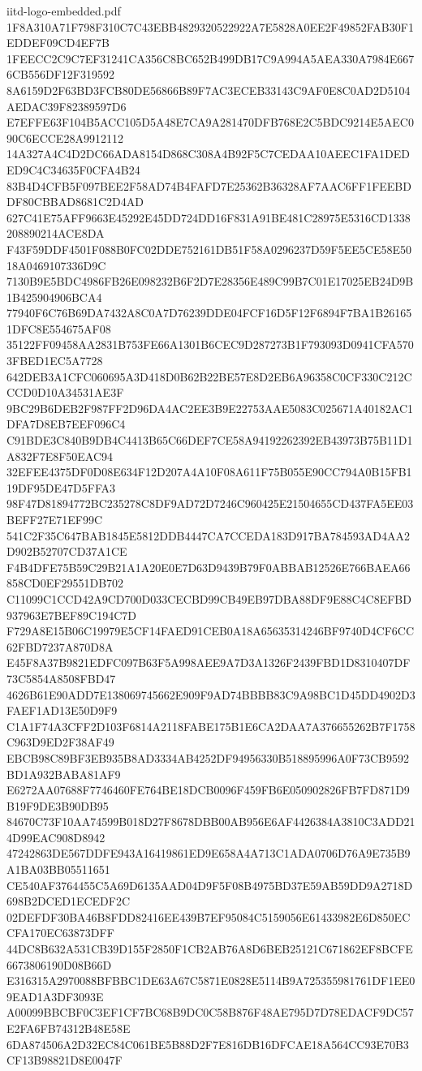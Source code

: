 \begin{filecontents*}[overwrite]{iitd-logo-embedded.pdf}
1F8A310A71F798F310C7C43EBB4829320522922A7E5828A0EE2F49852FAB30F1EDDEF09CD4EF7B
1FEECC2C9C7EF31241CA356C8BC652B499DB17C9A994A5AEA330A7984E6676CB556DF12F319592
8A6159D2F63BD3FCB80DE56866B89F7AC3ECEB33143C9AF0E8C0AD2D5104AEDAC39F82389597D6
E7EFFE63F104B5ACC105D5A48E7CA9A281470DFB768E2C5BDC9214E5AEC090C6ECCE28A9912112
14A327A4C4D2DC66ADA8154D868C308A4B92F5C7CEDAA10AEEC1FA1DEDED9C4C34635F0CFA4B24
83B4D4CFB5F097BEE2F58AD74B4FAFD7E25362B36328AF7AAC6FF1FEEBDDF80CBBAD8681C2D4AD
627C41E75AFF9663E45292E45DD724DD16F831A91BE481C28975E5316CD1338208890214ACE8DA
F43F59DDF4501F088B0FC02DDE752161DB51F58A0296237D59F5EE5CE58E5018A0469107336D9C
7130B9E5BDC4986FB26E098232B6F2D7E28356E489C99B7C01E17025EB24D9B1B425904906BCA4
77940F6C76B69DA7432A8C0A7D76239DDE04FCF16D5F12F6894F7BA1B261651DFC8E554675AF08
35122FF09458AA2831B753FE66A1301B6CEC9D287273B1F793093D0941CFA5703FBED1EC5A7728
642DEB3A1CFC060695A3D418D0B62B22BE57E8D2EB6A96358C0CF330C212CCCD0D10A34531AE3F
9BC29B6DEB2F987FF2D96DA4AC2EE3B9E22753AAE5083C025671A40182AC1DFA7D8EB7EEF096C4
C91BDE3C840B9DB4C4413B65C66DEF7CE58A94192262392EB43973B75B11D1A832F7E8F50EAC94
32EFEE4375DF0D08E634F12D207A4A10F08A611F75B055E90CC794A0B15FB119DF95DE47D5FFA3
98F47D81894772BC235278C8DF9AD72D7246C960425E21504655CD437FA5EE03BEFF27E71EF99C
541C2F35C647BAB1845E5812DDB4447CA7CCEDA183D917BA784593AD4AA2D902B52707CD37A1CE
F4B4DFE75B59C29B21A1A20E0E7D63D9439B79F0ABBAB12526E766BAEA66858CD0EF29551DB702
C11099C1CCD42A9CD700D033CECBD99CB49EB97DBA88DF9E88C4C8EFBD937963E7BEF89C194C7D
F729A8E15B06C19979E5CF14FAED91CEB0A18A65635314246BF9740D4CF6CC62FBD7237A870D8A
E45F8A37B9821EDFC097B63F5A998AEE9A7D3A1326F2439FBD1D8310407DF73C5854A8508FBD47
4626B61E90ADD7E138069745662E909F9AD74BBBB83C9A98BC1D45DD4902D3FAEF1AD13E50D9F9
C1A1F74A3CFF2D103F6814A2118FABE175B1E6CA2DAA7A376655262B7F1758C963D9ED2F38AF49
EBCB98C89BF3EB935B8AD3334AB4252DF94956330B518895996A0F73CB9592BD1A932BABA81AF9
E6272AA07688F7746460FE764BE18DCB0096F459FB6E050902826FB7FD871D9B19F9DE3B90DB95
84670C73F10AA74599B018D27F8678DBB00AB956E6AF4426384A3810C3ADD214D99EAC908D8942
47242863DE567DDFE943A16419861ED9E658A4A713C1ADA0706D76A9E735B9A1BA03BB05511651
CE540AF3764455C5A69D6135AAD04D9F5F08B4975BD37E59AB59DD9A2718D698B2DCED1ECEDF2C
02DEFDF30BA46B8FDD82416EE439B7EF95084C5159056E61433982E6D850ECCFA170EC63873DFF
44DC8B632A531CB39D155F2850F1CB2AB76A8D6BEB25121C671862EF8BCFE6673806190D08B66D
E316315A2970088BFBBC1DE63A67C5871E0828E5114B9A725355981761DF1EE09EAD1A3DF3093E
A00099BBCBF0C3EF1CF7BC68B9DC0C58B876F48AE795D7D78EDACF9DC57E2FA6FB74312B48E58E
6DA874506A2D32EC84C061BE5B88D2F7E816DB16DFCAE18A564CC93E70B3CF13B98821D8E0047F

\end{filecontents*}
